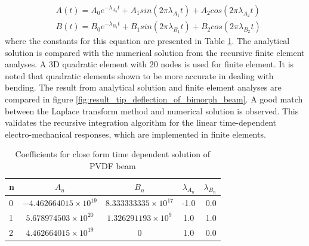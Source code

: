 \begin{equation}
\begin{aligned}
&A(t)=A_0 e^{-\lambda_{A_0} t}+A_1 sin(2\pi \lambda_{A_1} t)+A_2 cos(2\pi
\lambda_{A_2} t)
\\
&B(t)=B_0 e^{-\lambda_{B_0} t}+B_1 sin(2\pi \lambda_{B_1} t)+B_2 cos(2\pi
\lambda_{B_2} t)
\end{aligned}
\label{EQN:PVDF_beam_closed_form_solution_functions}
\end{equation}
where the constants for this equation are presented in Table \ref{table:PVDF_bimorph_time_dependent_solution_coefficients}.
The analytical solution is compared with the numerical solution from the recursive finite element analyses.
A 3D quadratic element with 20 nodes is used for finite element.
It is noted that quadratic elements shown to be more accurate in dealing with bending.
The result from analytical solution and finite element analyses are compared in figure \ref{fig:result_tip_deflection_of_bimorph_beam}.
A good match between the Laplace transform method and numerical solution is observed.
This validates the recursive integration algorithm for the linear time-dependent electro-mechanical responses, which are implemented in finite elements.

\begin{table}
\caption{Coefficients for close form time dependent solution of PVDF beam}
\centering
\begin{tabular}{|l|c|c|c|r|} \hline
n & $A_n$ & $B_n$ & $\lambda_{A_n}$& $\lambda_{B_n}$\\ \hline
0 & $-4.462664015\times 10^{19}$ & $8.333333335\times 10^{17}$ & -1.0 & 0.0\\ \hline
1 & $5.678974503\times 10^{20}$ & $1.326291193\times 10^9$ & 1.0 & 1.0\\ \hline
2 & $4.462664015\times 10^{19}$ & $0$ & 1.0 & 0.0 \\ \hline
\end{tabular}
\label{table:PVDF_bimorph_time_dependent_solution_coefficients}
\end{table}

